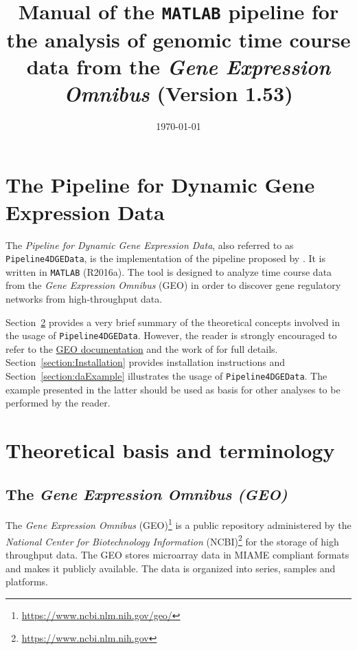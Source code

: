 \documentclass[final,letterpaper,12pt]{article}
\title{Manual of the \texttt{MATLAB} pipeline for the analysis of genomic time course data from the \textit{Gene Expression Omnibus} (Version 1.53)}
\date{\today}
\begin{document}
\maketitle

\tableofcontents

\listoffigures

\listoftables

\section{The Pipeline for Dynamic Gene Expression Data}
\label{section:pipeline}
\par The \textit{Pipeline for Dynamic Gene Expression Data}, also referred to as \texttt{Pipeline4DGEData}, is the implementation of the pipeline proposed by \cite{Carey2017}. It is written in \texttt{MATLAB} (R2016a). The tool is designed to analyze time course data from the \textit{Gene Expression Omnibus} (GEO) in order to discover gene regulatory networks from high-throughput data.

\par Section~\ref{section:theory_and_terminology} provides a very brief summary of the theoretical concepts involved in the usage of \texttt{Pipeline4DGEData}. However, the reader is strongly encouraged to refer to the \href{https://www.ncbi.nlm.nih.gov/geo/}{GEO documentation} and the work of \cite{Carey2017} for full details. Section~\ref{section:Installation} provides installation instructions and Section~\ref{section:daExample} illustrates the usage of \texttt{Pipeline4DGEData}.  The example presented in the latter should be used as basis for other analyses to be performed by the reader.

\section{Theoretical basis and terminology}
\label{section:theory_and_terminology}

\subsection{The \textit{Gene Expression Omnibus (GEO)}}

\par The \textit{Gene Expression Omnibus} (GEO)\footnote{\url{https://www.ncbi.nlm.nih.gov/geo/}} is a public repository administered by the \textit{National Center for Biotechnology Information} (NCBI)\footnote{\url{https://www.ncbi.nlm.nih.gov}} for the storage of high throughput data. The GEO stores microarray data in MIAME compliant formats and makes it publicly available. The data is organized into series, samples and platforms.
\end{document}
